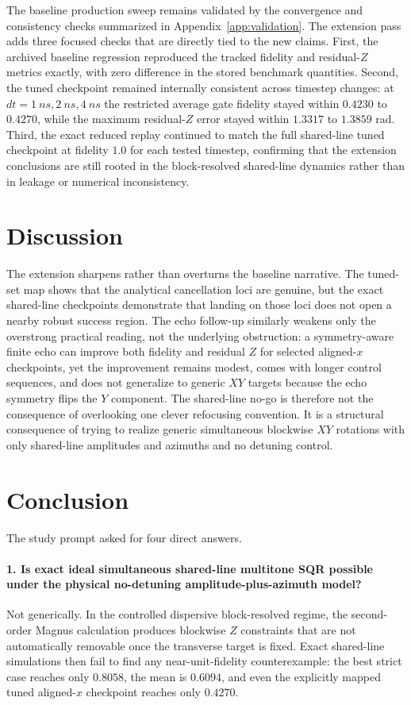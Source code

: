 \documentclass[aps,pra,twocolumn,reprint,floatfix,amsmath,amssymb]{revtex4-2}
\begin{document}
The baseline production sweep remains validated by the convergence and consistency checks summarized in Appendix~\ref{app:validation}. The extension pass adds three focused checks that are directly tied to the new claims. First, the archived baseline regression reproduced the tracked fidelity and residual-\(Z\) metrics exactly, with zero difference in the stored benchmark quantities. Second, the tuned checkpoint remained internally consistent across timestep changes: at \(dt=\SI{1}{ns},\SI{2}{ns},\SI{4}{ns}\) the restricted average gate fidelity stayed within \(0.4230\) to \(0.4270\), while the maximum residual-\(Z\) error stayed within \(1.3317\) to \(1.3859\) rad. Third, the exact reduced replay continued to match the full shared-line tuned checkpoint at fidelity \(1.0\) for each tested timestep, confirming that the extension conclusions are still rooted in the block-resolved shared-line dynamics rather than in leakage or numerical inconsistency.

\section{Discussion}
\label{sec:discussion}

The extension sharpens rather than overturns the baseline narrative. The tuned-set map shows that the analytical cancellation loci are genuine, but the exact shared-line checkpoints demonstrate that landing on those loci does not open a nearby robust success region. The echo follow-up similarly weakens only the overstrong practical reading, not the underlying obstruction: a symmetry-aware finite echo can improve both fidelity and residual \(Z\) for selected aligned-\(x\) checkpoints, yet the improvement remains modest, comes with longer control sequences, and does not generalize to generic \(XY\) targets because the echo symmetry flips the \(Y\) component. The shared-line no-go is therefore not the consequence of overlooking one clever refocusing convention. It is a structural consequence of trying to realize generic simultaneous blockwise \(XY\) rotations with only shared-line amplitudes and azimuths and no detuning control.

\section{Conclusion}
\label{sec:verdict}

The study prompt asked for four direct answers.

\paragraph*{1. Is exact ideal simultaneous shared-line multitone SQR possible under the physical no-detuning amplitude-plus-azimuth model?}
Not generically. In the controlled dispersive block-resolved regime, the second-order Magnus calculation produces blockwise \(Z\) constraints that are not automatically removable once the transverse target is fixed. Exact shared-line simulations then fail to find any near-unit-fidelity counterexample: the best strict case reaches only \(0.8058\), the mean is \(0.6094\), and even the explicitly mapped tuned aligned-\(x\) checkpoint reaches only \(0.4270\).
\end{document}
